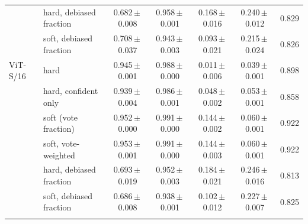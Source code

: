 \begin{table}[!htb]
{\begin{tabular}{llccccc}
 & hard, debiased fraction & 0.682\,$\pm$\,0.008 & 0.958\,$\pm$\,0.001 & 0.168\,$\pm$\,0.016 & 0.240\,$\pm$\,0.012 & 0.829 \\
 & soft, debiased fraction & 0.708\,$\pm$\,0.037 & 0.943\,$\pm$\,0.003 & 0.093\,$\pm$\,0.021 & 0.215\,$\pm$\,0.024 & 0.826 \\
\addlinespace
ViT-S/16 & hard & 0.945\,$\pm$\,0.001 & 0.988\,$\pm$\,0.000 & 0.011\,$\pm$\,0.006 & 0.039\,$\pm$\,0.001 & 0.898 \\
 & hard, confident only & 0.939\,$\pm$\,0.004 & 0.986\,$\pm$\,0.001 & 0.048\,$\pm$\,0.002 & 0.053\,$\pm$\,0.001 & 0.858 \\
 & soft (vote fraction) & 0.952\,$\pm$\,0.000 & 0.991\,$\pm$\,0.000 & 0.144\,$\pm$\,0.002 & 0.060\,$\pm$\,0.001 & 0.922 \\
 & soft, vote-weighted & 0.953\,$\pm$\,0.001 & 0.991\,$\pm$\,0.000 & 0.144\,$\pm$\,0.003 & 0.060\,$\pm$\,0.001 & 0.922 \\
 & hard, debiased fraction & 0.693\,$\pm$\,0.019 & 0.952\,$\pm$\,0.003 & 0.184\,$\pm$\,0.021 & 0.246\,$\pm$\,0.016 & 0.813 \\
 & soft, debiased fraction & 0.686\,$\pm$\,0.008 & 0.938\,$\pm$\,0.001 & 0.102\,$\pm$\,0.012 & 0.227\,$\pm$\,0.007 & 0.825 \\
\addlinespace
\bottomrule
\end{tabular}}
\end{table}
